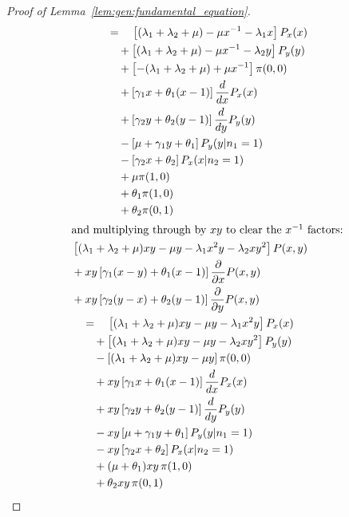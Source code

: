 \begin{proof}[Proof of Lemma~\ref{lem:gen:fundamental_equation}]
\begin{align}
\begin{split}
            & \quad = \quad \left[ (\lambda_1 + \lambda_2 + \mu) - \mu x^{-1} - \lambda_1 x \right] P_x(x) \\
            & \quad \quad + \left[ (\lambda_1 + \lambda_2 + \mu) - \mu x^{-1} - \lambda_2 y \right] P_y(y) \\
            & \quad \quad + \left[ -(\lambda_1 + \lambda_2 + \mu) + \mu x^{-1} \right] \pi(0,0) \\
            & \quad \quad + \left[ \gamma_1 x + \theta_1(x-1) \right] \frac{d}{dx} P_x(x) \\
            & \quad \quad + \left[ \gamma_2 y + \theta_2(y-1) \right] \frac{d}{dy} P_y(y) \\
            & \quad \quad - \left[ \mu + \gamma_1 y + \theta_1 \right] P_y(y | n_1=1) \\
            & \quad \quad - \left[ \gamma_2 x + \theta_2 \right] P_x(x | n_2=1) \\
            & \quad \quad + \mu \pi(1,0) \\
            & \quad \quad + \theta_1 \pi(1,0) \\
            & \quad \quad + \theta_2 \pi(0,1)
        \end{split} \nonumber \\
        \intertext{and multiplying through by $xy$ to clear the $x^{-1}$ factors:}
        \begin{split}
            & \left[ (\lambda_1+\lambda_2+\mu)xy - \mu y - \lambda_1 x^2 y - \lambda_2 x y^2 \right] P(x,y) \\
            & + xy \left[ \gamma_1(x-y) + \theta_1(x-1) \right] \frac{\partial}{\partial x} P(x,y) \\
            & + xy \left[ \gamma_2(y-x) + \theta_2(y-1) \right] \frac{\partial}{\partial y} P(x,y) \\
            & \quad = \quad \left[ (\lambda_1 + \lambda_2 + \mu)xy - \mu y - \lambda_1 x^2 y \right] P_x(x) \\
            & \quad \quad + \left[ (\lambda_1 + \lambda_2 + \mu)xy - \mu y - \lambda_2 x y^2 \right] P_y(y) \\
            & \quad \quad - \left[ (\lambda_1 + \lambda_2 + \mu)xy - \mu y \right] \pi(0,0) \\
            & \quad \quad + xy \left[ \gamma_1 x + \theta_1(x-1) \right] \frac{d}{dx} P_x(x) \\
            & \quad \quad + xy \left[ \gamma_2 y + \theta_2(y-1) \right] \frac{d}{dy} P_y(y) \\
            & \quad \quad - xy \left[ \mu + \gamma_1 y + \theta_1 \right] P_y(y | n_1=1) \\
            & \quad \quad - xy \left[ \gamma_2 x + \theta_2 \right] P_x(x | n_2=1) \\
            & \quad \quad + (\mu + \theta_1) xy \, \pi(1,0) \\
            & \quad \quad + \theta_2 xy \, \pi(0,1)
        \end{split} \label{eq:gen:transform_interior}
    \end{align}
    

\end{proof}
